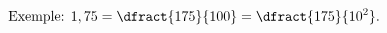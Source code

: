 \documentclass[preview]{standalone}
\begin{document}
\begin{align*}
\text{Exemple: } 1,75 = \dfract{175}{100} = \dfract{175}{10^2}.
\end{align*}
\end{document}
